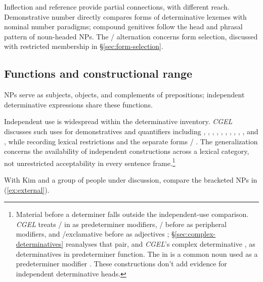 \documentclass[12pt]{article}
\begin{document}
Inflection and reference provide partial connections, with different reach. Demonstrative number directly compares forms of determinative lexemes with nominal number paradigms; compound genitives follow the head and phrasal pattern of noun-headed NPs. The /\allowbreak{} alternation concerns form selection, discussed with restricted membership in §\ref{sec:form-selection}.

\subsection{Functions and constructional range}\label{sec:independent}

NPs serve as subjects, objects, and complements of prepositions; independent determinative expressions share these functions.

Independent use is widespread within the determinative inventory. \textit{CGEL} discusses such uses for demonstratives and quantifiers including , , , , , , , , , , and , while recording lexical restrictions and the separate forms / \citep[371--372, 410--424]{huddleston2002}. The generalization concerns the availability of independent constructions across a lexical category, not unrestricted acceptability in every sentence frame.\footnote{Material before a determiner falls outside the independent-use comparison. \textit{CGEL} treats / in  as predeterminer modifiers, / before  as peripheral modifiers, and /exclamative  before  as adjectives \citep[433--437]{huddleston2002}; §\ref{sec:complex-determinatives} reanalyses that pair, and \textit{CGEL}'s complex determinative  \citep[394]{huddleston2002}, as determinatives in predeterminer function. The  in  is a common noun used as a predeterminer modifier \citep[434]{huddleston2002}. These constructions don't add evidence for independent determinative heads.}

With Kim and a group of people under discussion, compare the bracketed NPs in (\ref{ex:external}).

\begin{samepage}

\ea\label{ex:external}
\ea {}\qquad {}\qquad {}
\ex {}\qquad {}\qquad {}
\ex {}\qquad {}\qquad {}
\ex {}\qquad {}\qquad {}
\z\z

\end{samepage}
\end{document}
